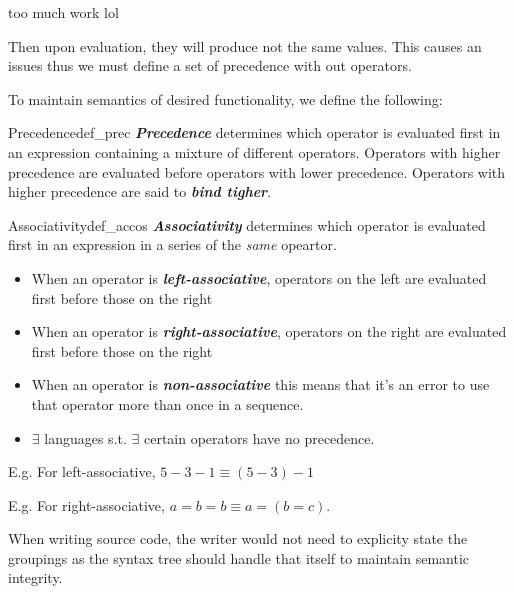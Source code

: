 \documentclass[12pt,a4paper]{article}
\newcommand{\newpar} {
  \vspace{1em}
  \noindent
}
\newcommand{\bemph}[1]{\textbf{\emph{#1}}}
\begin{document}
too much work lol

\newpar
Then upon evaluation, they will produce not the same values. This causes an issues
thus we must define a set of precedence with out operators.

\newpar
To maintain semantics of desired functionality, we define the following:

\begin{definition}{Precedence}{def_prec}\label{def_prec}
	\bemph{Precedence} determines which operator is evaluated first in an expression containing
	a mixture of different operators.
	Operators with higher precedence are evaluated before operators with lower precedence.
	Operators with higher precedence are said to \bemph{bind tigher}.
\end{definition}

\begin{definition}{Associativity}{def_accos}\label{def_assoc}
	\bemph{Associativity} determines which operator is evaluated first in an expression in a series of the
	\textit{same} opeartor.
	\begin{itemize}
		\item When an operator is \bemph{left-associative}, operators on the left are evaluated first before those on the right
		\item When an operator is \bemph{right-associative}, operators on the right are evaluated first before those on the right
		\item When an operator is \bemph{non-associative} this means that it's an error to use that operator more than once in a sequence.
		\item \(\exists\) languages s.t. \(\exists\) certain operators have no precedence.
	\end{itemize}
\end{definition}

\newpar
E.g. For left-associative, \(5 - 3 - 1 \equiv (5 - 3) - 1\)

\newpar
E.g. For right-associative, \(a = b = b \equiv a = (b = c)\).

\newpar
When writing source code, the writer would not need to explicity state the groupings
as the syntax tree should handle that itself to maintain semantic integrity.
\end{document}
